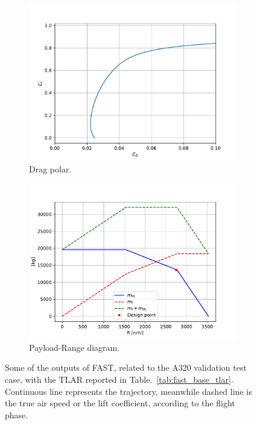 \begin{figure}[!h]
	\begin{subfigure}{0.45\textwidth}
		\centering
		\includegraphics[keepaspectratio, width=\linewidth]{images/chap2/FAST_base_polar}
		\caption{Drag polar.}
		\label{fig:fast_base_polar}
	\end{subfigure}
	\hspace{10mm}
	\begin{subfigure}{0.45\textwidth}
		\centering
		\includegraphics[keepaspectratio, width=\linewidth]{images/chap2/FAST_base_pl_range}
		\caption{Payload-Range diagram.}
		\label{fig:fast_base_pl_range}
	\end{subfigure}
	\caption{Some of the outputs of FAST, related to the A320 validation test case, with the TLAR reported in Table.~\ref{tab:fast_base_tlar}.
	Continuous line represents the trajectory, meanwhile dashed line is the true air speed or the lift coefficient, according to the flight phase.}
	\label{fig:fast_base_results}
\end{figure}


